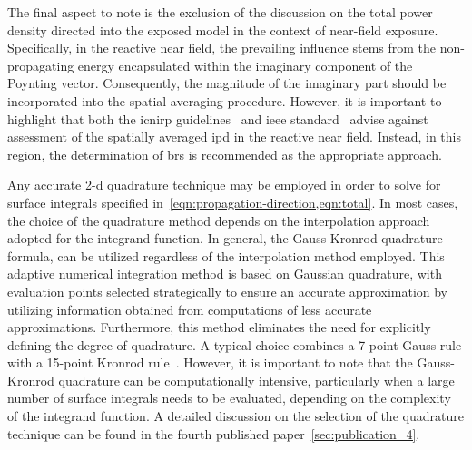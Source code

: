 The final aspect to note is the exclusion of the discussion on the total power density directed into the exposed model in the context of near-field exposure.
Specifically, in the reactive near field, the prevailing influence stems from the non-propagating energy encapsulated within the imaginary component of the Poynting vector.
Consequently, the magnitude of the imaginary part should be incorporated into the spatial averaging procedure.
However, it is important to highlight that both the \gls{icnirp} guidelines~\cite{ICNIRP2020Guidelines} and \gls{ieee} standard~\cite{IEEE2019Standard} advise against assessment of the spatially averaged \gls{ipd} in the reactive near field.
Instead, in this region, the determination of \gls{br}s is recommended as the appropriate approach.

Any accurate \gls{2-d} quadrature technique may be employed in order to solve for surface integrals specified in~\cref{eqn:propagation-direction,eqn:total}.
In most cases, the choice of the quadrature method depends on the interpolation approach adopted for the integrand function.
In general, the Gauss-Kronrod quadrature formula, can be utilized regardless of the interpolation method employed.
This adaptive numerical integration method is based on Gaussian quadrature, with evaluation points selected strategically to ensure an accurate approximation by utilizing information obtained from computations of less accurate approximations.
Furthermore, this method eliminates the need for explicitly defining the degree of quadrature.
A typical choice combines a \num{7}-point Gauss rule with a \num{15}-point Kronrod rule~\cite{Kahaner1989Numerical}.
However, it is important to note that the Gauss-Kronrod quadrature can be computationally intensive, particularly when a large number of surface integrals needs to be evaluated, depending on the complexity of the integrand function.
A detailed discussion on the selection of the quadrature technique can be found in the fourth published paper~\cref{sec:publication_4}.

